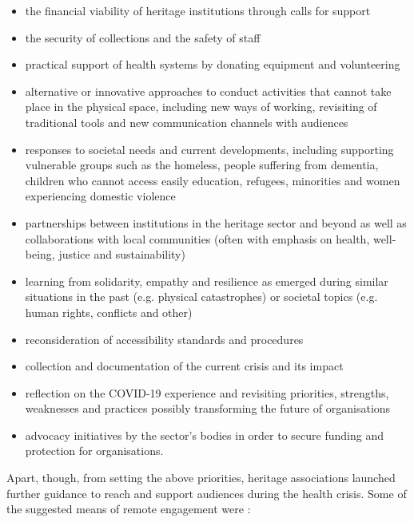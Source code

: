 \documentclass{egpubl}
\begin{document}
\begin{itemize}
\item the financial viability of heritage institutions through calls for support
\item the security of collections and the safety of staff
\item practical support of health systems by donating equipment and volunteering 
\item alternative or innovative approaches to conduct activities that cannot take place in the physical space, including new ways of working, revisiting of traditional tools and new communication channels with audiences
\item responses to societal needs and current developments, including supporting vulnerable groups such as the homeless, people suffering from dementia, children who cannot access easily education, refugees, minorities and women experiencing domestic violence
\item partnerships between institutions in the heritage sector and beyond as well as collaborations with local communities (often with emphasis on health, well-being, justice and sustainability)
\item learning from solidarity, empathy and resilience as emerged during similar situations in the past (e.g. physical catastrophes) or societal topics (e.g. human rights, conflicts and other)
\item reconsideration of accessibility standards and procedures
\item collection and documentation of the current crisis and its impact
\item reflection on the COVID-19 experience and revisiting priorities, strengths, weaknesses and practices possibly transforming the future of organisations
\item advocacy initiatives by the sector's bodies in order to secure funding and protection for organisations.
\end{itemize}

Apart, though, from setting the above priorities, heritage associations launched further guidance to reach and support audiences during the health crisis. Some of the suggested means of remote engagement were \cite{InternationalCouncilofMuseums2020,Ciecko2020,NetworkofEuropeanMuseumOrganisations2020}:
\end{document}
